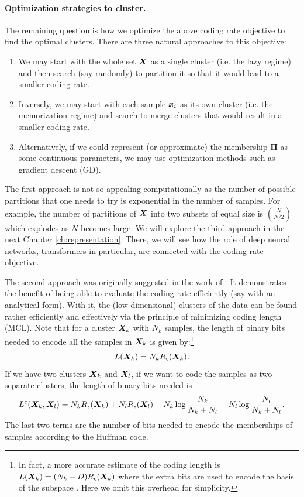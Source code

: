 \documentclass[../../book-main.tex]{subfiles}
\begin{document}
\paragraph{Optimization strategies to cluster.}
The remaining question is how we optimize the above coding rate objective to find the optimal clusters. There are three natural approaches to this objective:
\begin{enumerate}
	\item We may start with the whole set $\bm{X}$ as a single cluster (i.e. the lazy regime) and then search (say randomly) to partition it so that it would lead to a smaller coding rate.
	\item Inversely, we may start with each sample $\bm{x}_i$ as its own cluster (i.e. the memorization regime)  and search to merge clusters that would result in a smaller coding rate.
	\item Alternatively, if we could represent (or approximate) the membership $\boldsymbol{\Pi}$ as some continuous parameters, we may use optimization methods such as gradient descent (GD).
\end{enumerate}
The first approach is not so appealing computationally as the number of possible partitions that one needs to try is exponential in the number of samples. For example, the number of partitions of $\bm{X}$ into two subsets of equal size is $N \choose N/2$ which explodes as $N$ becomes large. We will explore the third approach in the next Chapter \ref{ch:representation}. There, we will see how the role of deep neural networks, transformers in particular, are connected with the coding rate objective.



The second approach was originally suggested in the work of \cite{ma2007segmentation}. It demonstrates the benefit of being able to evaluate the coding rate efficiently (say with an analytical form). With it, the (low-dimensional) clusters of the data can be found rather efficiently and effectively via the principle of minimizing coding length (MCL). Note that for a cluster $\bm{X}_k$ with $N_k$ samples, the length of binary bits needed to encode all the samples in $\bm{X}_k$ is given by:\footnote{In fact, a more accurate estimate of the coding length is $L(\bm{X}_k) = (N_k+D) R_\epsilon(\bm{X}_k)$ where the extra bits are used to encode the basis of the subspace \cite{ma2007segmentation}. Here we omit this overhead for simplicity.}
\begin{equation}
	L(\bm{X}_k) = N_k R_\epsilon(\bm{X}_k).
\end{equation}
If we have two clusters $\bm{X}_k$ and $\bm{X}_l$, if we want to code the samples as two separate clusters, the length of binary bits needed is
\begin{equation*}
	L^c(\bm{X}_k, \bm{X}_l) = N_k R_\epsilon(\bm{X}_k) + N_l R_\epsilon(\bm{X}_l) - N_k \log\frac{N_k}{N_k + N_l} - N_l \log\frac{N_l}{N_k + N_l}.
\end{equation*}
The last two terms are the number of bits needed to encode the memberships of samples according to the Huffman code.
\end{document}
